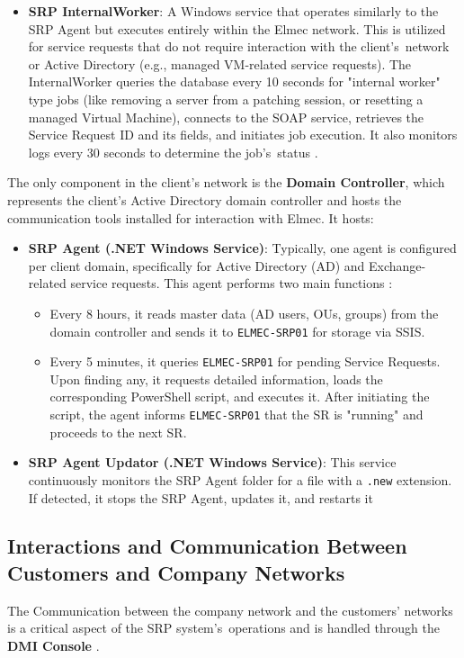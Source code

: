 \begin{itemize}
\begin{itemize}
        \item \textbf{SRP InternalWorker}: A Windows service that operates similarly to the SRP Agent but executes entirely within the Elmec network. This is utilized for service requests that do not require interaction with the client's~network or Active Directory (e.g., managed VM-related service requests). The InternalWorker queries the database every 10 seconds for "internal worker" type jobs (like removing a server from a patching session, or resetting a managed Virtual Machine), connects to the SOAP service, retrieves the Service Request ID and its fields, and initiates job execution. It also monitors logs every 30 seconds to determine the job's~status \cite{srp_internalworker_git}.
    \end{itemize}
\end{itemize}

The only component in the client's network is the \textbf{Domain Controller}, which represents the client's Active Directory domain controller and hosts the communication tools installed for interaction with Elmec. It hosts:
\begin{itemize}
    \item \textbf{SRP Agent (.NET Windows Service)}: Typically, one agent is configured per client domain, specifically for Active Directory (AD) and Exchange-related service requests. This agent performs two main functions \cite{srp_windowsservice_git}:
    \begin{itemize}
        \item Every 8 hours, it reads master data (AD users, OUs, groups) from the domain controller and sends it to \texttt{ELMEC-SRP01} for storage via SSIS.
        \item Every 5 minutes, it queries \texttt{ELMEC-SRP01} for pending Service Requests. Upon finding any, it requests detailed information, loads the corresponding PowerShell script, and executes it. After initiating the script, the agent informs \texttt{ELMEC-SRP01} that the SR is "running" and proceeds to the next SR.
    \end{itemize}
    
    \item \textbf{SRP Agent Updator (.NET Windows Service)}: This service continuously monitors the SRP Agent folder for a file with a \texttt{.new} extension. If detected, it stops the SRP Agent, updates it, and restarts it
\end{itemize}

\subsection{Interactions and Communication Between Customers and Company Networks}
The Communication between the company network and the customers' networks is a critical aspect of the SRP system's~operations and is handled through the \textbf{DMI Console} \cite{service_request_portal}.

